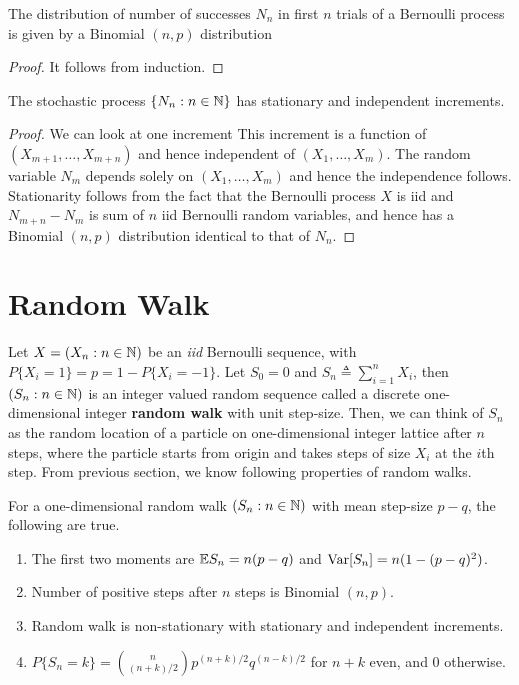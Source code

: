 \documentclass[a4paper,10pt,english]{article}
\begin{document}
\begin{thm} The distribution of number of successes $N_n$ in first $n$ trials of a Bernoulli process is given by a Binomial $(n,p)$ distribution 
\end{thm}
\begin{proof} 
It follows from induction. 
\end{proof}
\begin{cor} 
The stochastic process $\{N_n: n \in \mathbb{N}\}$ has stationary and independent increments.
\end{cor}
\begin{proof}
We can look at one increment 
This increment is a function of $(X_{m+1}, \dots, X_{m+n})$ and hence independent of $(X_1, \dots, X_m)$. 
The random variable $N_m$ depends solely on $(X_1, \dots, X_m)$ and hence the independence follows. 
Stationarity follows from the fact that the Bernoulli process $X$ is iid and $N_{m+n}-N_m$ is sum of $n$ iid Bernoulli random variables, 
and hence has a Binomial $(n,p)$ distribution identical to that of $N_n$. 
\end{proof}

\section{Random Walk}
Let $X = (X_n: n \in \mathbb{N})$ be an \emph{iid} Bernoulli sequence, with $P\{X_i = 1\} = p = 1 - P\{X_i = -1\}$. 
Let $S_0 = 0$ and $S_n \triangleq \sum_{i=1}^nX_i$, then $(S_n: n \in \mathbb{N})$ is an integer valued random sequence called a discrete one-dimensional integer \textbf{random walk} with unit step-size. %
Then, we can think of $S_n$ as the random location of a particle on one-dimensional integer lattice after $n$ steps, 
where the particle starts from origin and takes steps of size $X_i$ at the $i$th step. 
From previous section, we know following properties of random walks. 
\begin{thm} 
For a one-dimensional random walk $(S_n: n \in \mathbb{N})$ with mean step-size $p-q$, the following are true. 
\begin{enumerate}[i\_]
\item The first two moments are $\mathbb{E} S_n = n(p-q)$ and $\operatorname{Var}[S_n] = n(1 - (p-q)^2)$. 
\item Number of positive steps after $n$ steps is Binomial $(n,p)$. 
\item Random walk is non-stationary with stationary and independent increments. 
\item $P\{S_n = k\} = \binom{n}{(n+k)/2}p^{(n+k)/2}q^{(n-k)/2}$ for $n+k$ even, and $0$ otherwise. 
\end{enumerate}
\end{thm}
\end{document}
